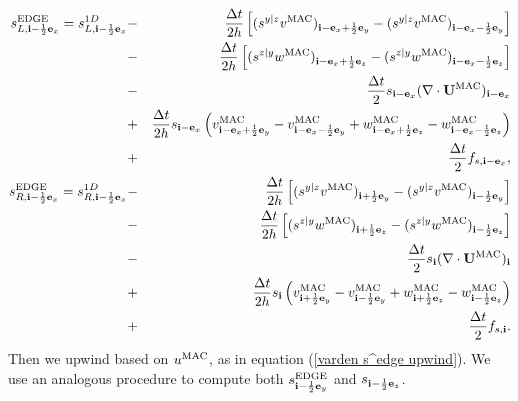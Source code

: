 \begin{eqnarray}
s_{L,{\bf i}-\frac{1}{2}{\bf e}_x}^{\rm EDGE} = s_{L,{\bf i}-\frac{1}{2}{\bf e}_x}^{1D} &-& \frac{\Delta t}{2h}\left[(s^{y|z}v^{\rm MAC})_{{\bf i}-{\bf e}_x+\frac{1}{2}{\bf e}_y}-({s^{y|z}v^{\rm MAC})_{{\bf i}-{\bf e}_x-\frac{1}{2}{\bf e}_y}}\right] \nonumber \\
&-& \frac{\Delta t}{2h}\left[(s^{z|y}w^{\rm MAC})_{{\bf i}-{\bf e}_x+\frac{1}{2}{\bf e}_z}-({s^{z|y}w^{\rm MAC})_{{\bf i}-{\bf e}_x-\frac{1}{2}{\bf e}_z}}\right] \nonumber \\
&-& \frac{\Delta t}{2}s_{{\bf i}-{\bf e}_x}(\nabla\cdot{\bf U}^{\rm MAC})_{{\bf i}-{\bf e}_x} \nonumber \\
&+& \frac{\Delta t}{2h}s_{{\bf i}-{\bf e}_x}\left(v_{{\bf i}-{\bf e}_x+\frac{1}{2}{\bf e}_y}^{\rm MAC}-v_{{\bf i}-{\bf e}_x-\frac{1}{2}{\bf e}_y}^{\rm MAC}+w_{{\bf i}-{\bf e}_x+\frac{1}{2}{\bf e}_z}^{\rm MAC}-w_{{\bf i}-{\bf e}_x-\frac{1}{2}{\bf e}_z}^{\rm MAC}\right) \nonumber \\
&+& \frac{\Delta t}{2}f_{s,{\bf i}-{\bf e}_x}, \\
s_{R,{\bf i}-\frac{1}{2}{\bf e}_x}^{\rm EDGE} = s_{R,{\bf i}-\frac{1}{2}{\bf e}_x}^{1D} &-& \frac{\Delta t}{2h}\left[(s^{y|z}v^{\rm MAC})_{{\bf i}+\frac{1}{2}{\bf e}_y}-({s^{y|z}v^{\rm MAC})_{{\bf i}-\frac{1}{2}{\bf e}_y}}\right] \nonumber \\
&-& \frac{\Delta t}{2h}\left[(s^{z|y}w^{\rm MAC})_{{\bf i}+\frac{1}{2}{\bf e}_z}-({s^{z|y}w^{\rm MAC})_{{\bf i}-\frac{1}{2}{\bf e}_z}}\right] \nonumber \\
&-& \frac{\Delta t}{2}s_{{\bf i}}(\nabla\cdot{\bf U}^{\rm MAC})_{{\bf i}} \nonumber \\
&+& \frac{\Delta t}{2h}s_{{\bf i}}\left(v_{{\bf i}+\frac{1}{2}{\bf e}_y}^{\rm MAC}-v_{{\bf i}-\frac{1}{2}{\bf e}_y}^{\rm MAC}+w_{{\bf i}+\frac{1}{2}{\bf e}_z}^{\rm MAC}-w_{{\bf i}-\frac{1}{2}{\bf e}_z}^{\rm MAC}\right) \nonumber \\
&+& \frac{\Delta t}{2}f_{s,{\bf i}}.
\end{eqnarray}
Then we upwind based on $u^{\rm MAC}$, as in equation 
(\ref{varden s^edge upwind}).  
We use an analogous procedure to compute both
$s_{{\bf i}-\frac{1}{2}{\bf e}_y}^{\rm EDGE}$ and $s_{{\bf i}-\frac{1}{2}{\bf e}_z}$.

\newpage


